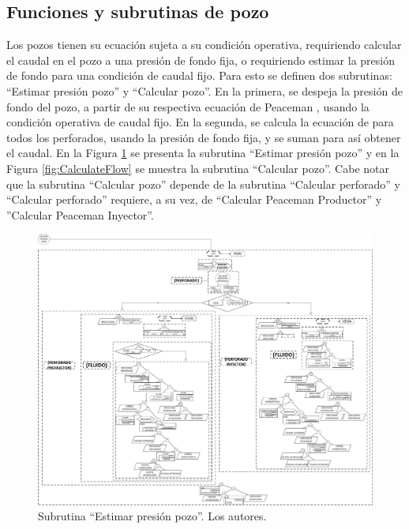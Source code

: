 \subsection{Funciones y subrutinas de pozo}\label{subsec:PS_WellFunctions}
Los pozos tienen su ecuación sujeta a su condición operativa, requiriendo calcular el caudal en el pozo a una presión de fondo fija, o requiriendo estimar la presión de fondo para una condición de caudal fijo. Para esto se definen dos subrutinas: ``Estimar presión pozo'' y ``Calcular pozo''. En la primera, se despeja la presión de fondo del pozo, a partir de su respectiva ecuación de Peaceman \citep{peaceman1983interpretation}, usando la condición operativa de caudal fijo. En la segunda, se calcula la ecuación de \cite{peaceman1983interpretation} para todos los perforados, usando la presión de fondo fija, y se suman para así obtener el caudal. En la Figura \ref{fig:EstimatePwf} se presenta la subrutina ``Estimar presión pozo'' y en la Figura \ref{fig:CalculateFlow} se muestra la subrutina ``Calcular pozo''. Cabe notar que la subrutina ``Calcular pozo'' depende de la subrutina ``Calcular perforado'' y ``Calcular perforado'' requiere, a su vez, de ``Calcular Peaceman Productor'' y ''Calcular Peaceman Inyector''. 

\begin{figure}[h]
	\centering%
	\includegraphics[width=1\linewidth]{Fig/EstimarPwf.pdf}%
	\caption[Subrutina ``Estimar presión pozo''.]{Subrutina ``Estimar presión pozo''. Los autores.}
	\label{fig:EstimatePwf}
\end{figure}


